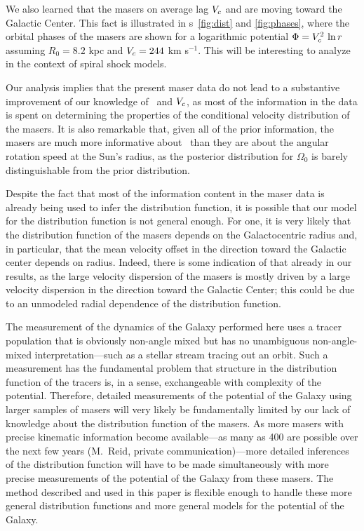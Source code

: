 We also learned that the masers on average lag $V_c$ and are moving
toward the Galactic Center. This fact is illustrated in \figurename
s~\ref{fig:dist} and \ref{fig:phases}, where the orbital phases of the
masers are shown for a logarithmic potential $\Phi = V_c^2 \,\ln r$
\citep[\eg, \eqnname~(3.14) in][]{2008gady.book.....B} assuming $R_0 =
8.2$ kpc and $V_c = 244$ km s$^{-1}$. This will be interesting to
analyze in the context of spiral shock models.

Our analysis implies that the present maser data do not lead to a
substantive improvement of our knowledge of \Ro\ and $V_c$, as most of
the information in the data is spent on determining the properties of
the conditional velocity distribution of the masers. It is also
remarkable that, given all of the prior information, the masers are
much more informative about \Ro\ than they are about the angular
rotation speed at the Sun's radius, as the posterior distribution for
$\Omega_0$ is barely distinguishable from the prior distribution.

Despite the fact that most of the information content in the maser
data is already being used to infer the distribution function, it is
possible that our model for the distribution function is not general
enough. For one, it is very likely that the distribution function of
the masers depends on the Galactocentric radius and, in particular,
that the mean velocity offset in the direction toward the Galactic
center depends on radius. Indeed, there is some indication of that
already in our results, as the large velocity dispersion of the masers
is mostly driven by a large velocity dispersion in the direction
toward the Galactic Center; this could be due to an unmodeled radial
dependence of the distribution function.

The measurement of the dynamics of the Galaxy performed here uses a
tracer population that is obviously non-angle mixed but has no
unambiguous non-angle-mixed interpretation---such as a stellar stream
tracing out an orbit. Such a measurement has the fundamental problem
that structure in the distribution function of the tracers is, in a
sense, exchangeable with complexity of the potential. Therefore,
detailed measurements of the potential of the Galaxy using larger
samples of masers will very likely be fundamentally limited by our
lack of knowledge about the distribution function of the masers. As
more masers with precise kinematic information become available---as
many as 400 are possible over the next few years (M.~Reid, private
communication)---more detailed inferences of the distribution function
will have to be made simultaneously with more precise measurements of
the potential of the Galaxy from these masers. The method described
and used in this paper is flexible enough to handle these more general
distribution functions and more general models for the potential of
the Galaxy.

